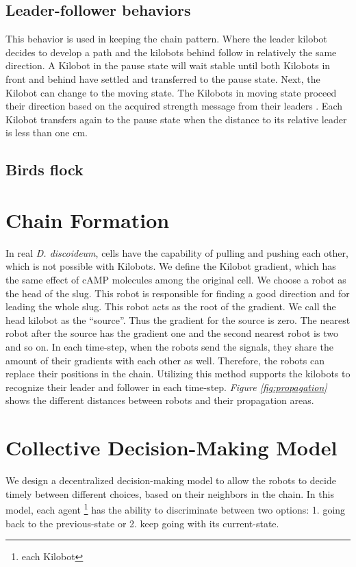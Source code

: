 \documentclass[11pt,a4paper]{article}
\begin{document}
\subsection{Leader-follower behaviors} This behavior is used in keeping the chain pattern. Where the leader kilobot decides to develop a path and the kilobots behind follow in relatively the same direction. A Kilobot in the pause state will wait stable until both Kilobots in front and behind have settled and transferred to the pause state. Next, the Kilobot can change to the moving state.
The Kilobots in moving state proceed their direction based on the acquired strength message from their leaders \cite{Beckerleg2016EvolvingRobot}. Each Kilobot transfers again to the pause state when the distance to its relative leader is less than one cm. 
\subsection{Birds flock}

\section {Chain Formation} 
In real \textit{D. discoideum}, cells have the capability of pulling and pushing each other, which is not possible with Kilobots. We define the Kilobot gradient, which has the same effect of cAMP molecules among the original cell. We choose a robot as the head of the slug. This robot is responsible for finding a good direction and for leading the whole slug. This robot acts as the root of the gradient. We call the head kilobot as the ``source''. Thus the gradient for the source is zero. The nearest robot after the source has the gradient one and the second nearest robot is two and so on. In each time-step, when the robots send the signals, they share the amount of their gradients with each other as well. Therefore, the robots can replace their positions in the chain. Utilizing this method supports the kilobots to recognize their leader and follower in each time-step. \textit{Figure \ref{fig:propagation}} shows the different distances between robots and their propagation areas. 


\section{Collective Decision-Making Model}
We design a decentralized decision-making model to allow the robots to decide timely between different choices, based on their neighbors in the chain. In this model, each agent \footnote{each Kilobot} has the ability to discriminate between two options: 1. going back to the previous-state or 2. keep going with its current-state. 
\end{document}
